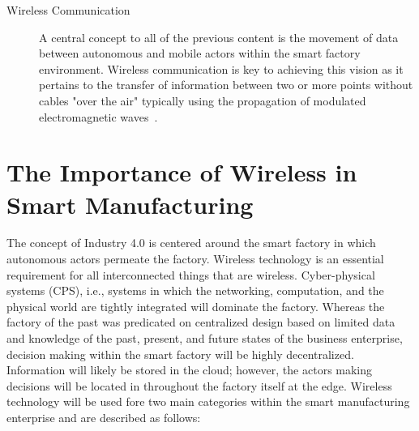 \begin{description}
	\item[Wireless Communication] A central concept to all of the previous content is the movement of data between autonomous and mobile actors within the smart factory environment.  Wireless communication is key to achieving this vision as it pertains to the transfer of information between two or more points without cables "over the air" typically using the propagation of modulated electromagnetic waves~\cite{proakis1995digital}.


\end{description}



\section{The Importance of Wireless in Smart Manufacturing}
The concept of Industry 4.0 is centered around the smart factory in which autonomous actors permeate the factory.  Wireless technology is an essential requirement for all interconnected things that are wireless. Cyber-physical systems (CPS), i.e., systems in which the networking, computation, and the physical world are tightly integrated will dominate the factory.  Whereas the factory of the past was predicated on centralized design based on limited data and knowledge of the past, present, and future states of the business enterprise, decision making within the smart factory will be highly decentralized.  Information will likely be stored in the cloud; however, the actors making decisions will be located in throughout the factory itself at the edge.  Wireless technology will be used fore two main categories within the smart manufacturing enterprise and are described as follows:


